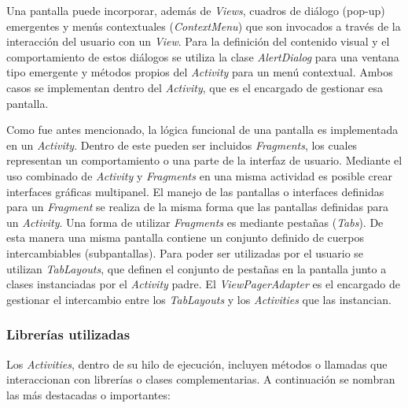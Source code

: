     \par Una pantalla puede incorporar, además de \textit{Views}, cuadros de diálogo (pop-up) emergentes y menús contextuales (\textit{ContextMenu}) que son invocados a través de la interacción del usuario con un \textit{View}. Para la definición del contenido visual y el comportamiento de estos diálogos se utiliza la clase \textit{AlertDialog} para una ventana tipo emergente y métodos propios del \textit{Activity} para un menú contextual. Ambos casos se implementan dentro del \textit{Activity}, que es el encargado de gestionar esa pantalla.
        
    \par Como fue antes mencionado, la lógica funcional de una pantalla es implementada en un \textit{Activity}. Dentro de este pueden ser incluidos \textit{Fragments}, los cuales representan un comportamiento o una parte de la interfaz de usuario. Mediante el uso combinado de \textit{Activity} y \textit{Fragments} en una misma actividad es posible crear interfaces gráficas multipanel. El manejo de las pantallas o interfaces definidas para un \textit{Fragment} se realiza de la misma forma que las pantallas definidas para un \textit{Activity}. Una forma de utilizar \textit{Fragments} es mediante pestañas (\textit{Tabs}). De esta manera una misma pantalla contiene un conjunto definido de cuerpos intercambiables (subpantallas). Para poder ser utilizadas por el usuario se utilizan \textit{TabLayouts}, que definen el conjunto de pestañas en la pantalla junto a clases instanciadas por el \textit{Activity} padre. El \textit{ViewPagerAdapter} es el encargado de gestionar el intercambio entre los \textit{TabLayouts} y los \textit{Activities} que las instancian.
    
    \subsubsection{Librerías utilizadas}
     \par Los \textit{Activities}, dentro de su hilo de ejecución, incluyen métodos o llamadas que interaccionan con librerías o clases complementarias. A continuación se nombran las más destacadas o importantes: 
     
